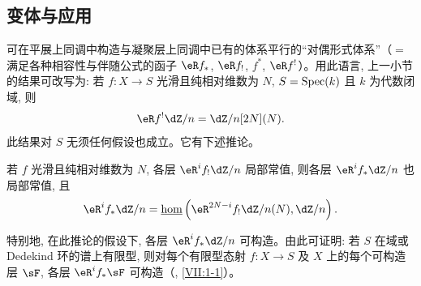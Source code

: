 \subsection{变体与应用}\label{I:6-4}

可在平展上同调中构造与凝聚层上同调中已有的体系平行的“对偶形式体系”（$=$ 满足各种相容性与伴随公式的函子 $\eR f_*$, $\eR f_!$, $f^*$, $\eR f^!$）。用此语言, 上一小节的结果可改写为: 若 $f:X\to S$ 光滑且纯相对维数为 $N$, $S=\operatorname{Spec}(k)$ 且 $k$ 为代数闭域, 则
\[
  \eR f^! \dZ/n = \dZ/n [2N](N) \text{.}
\]
此结果对 $S$ 无须任何假设也成立。它有下述推论。

\begin{corollary}\label{I:6-4-1}
若 $f$ 光滑且纯相对维数为 $N$, 各层 $\eR^if_!\dZ/n$ 局部常值, 则各层 $\eR^if_*\dZ/n$ 也局部常值, 且
\[
  \eR^i f_* \dZ/n = \const\hom\left(\eR^{2 N-i} f_! \dZ/n(N),\dZ/n\right)\text{.}
\]
\end{corollary}

特别地, 在此推论的假设下, 各层 $\eR^if_*\dZ/n$ 可构造。由此可证明: 若 $S$ 在域或 Dedekind 环的谱上有限型, 则对每个有限型态射 $f:X\to S$ 及 $X$ 上的每个可构造层 $\sF$, 各层 $\eR^if_*\sF$ 可构造（, \ref{VII:1-1}）。
